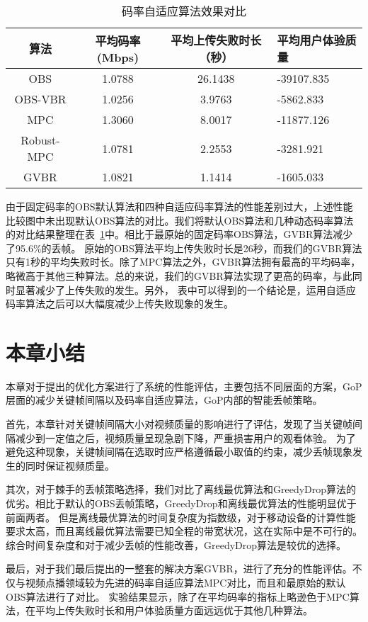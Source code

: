 \begin{table}[tb]
\centering
\caption{码率自适应算法效果对比}
\label{tab:vbr}
{\setlength{\tabcolsep}{2pt}
\begin{tabular}{|c|c|c|l|}
\hline
\textbf{算法} &\textbf{平均码率(Mbps)} &\textbf{平均上传失败时长（秒）} & \textbf{平均用户体验质量}    \\ \hline
OBS    &1.0788  &26.1438  &-39107.835           \\ \hline
OBS-VBR  &1.0256 &3.9763  &-5862.833         \\ \hline
MPC     &1.3060  &8.0017  &-11877.126 \\ \hline
Robust-MPC &1.0781 &2.2553 &-3281.921 \\ \hline
GVBR &1.0821 &1.1414 &-1605.033 \\ \hline
\end{tabular}}
\end{table}

由于固定码率的OBS默认算法和四种自适应码率算法的性能差别过大，上述性能比较图中未出现默认OBS算法的对比。我们将默认OBS算法和几种动态码率算法的对比结果整理在表~\ref{tab:vbr}中。相比于最原始的固定码率OBS算法，GVBR算法减少了95.6\%的丢帧。
原始的OBS算法平均上传失败时长是26秒，而我们的GVBR算法只有1秒的平均失败时长。除了MPC算法之外，GVBR算法拥有最高的平均码率，略微高于其他三种算法。总的来说，我们的GVBR算法实现了更高的码率，与此同时显著减少了上传失败的发生。另外，
表中可以得到的一个结论是，运用自适应码率算法之后可以大幅度减少上传失败现象的发生。

\section{本章小结}
本章对于提出的优化方案进行了系统的性能评估，主要包括不同层面的方案，GoP层面的减少关键帧间隔以及码率自适应算法，GoP内部的智能丢帧策略。

首先，本章针对关键帧间隔大小对视频质量的影响进行了评估，发现了当关键帧间隔减少到一定值之后，视频质量呈现急剧下降，严重损害用户的观看体验。
为了避免这种现象，关键帧间隔在选取时应严格遵循最小取值的约束，减少丢帧现象发生的同时保证视频质量。

其次，对于棘手的丢帧策略选择，我们对比了离线最优算法和GreedyDrop算法的优劣。相比于默认的OBS丢帧策略，GreedyDrop和离线最优算法的性能明显优于前面两者。
但是离线最优算法的时间复杂度为指数级，对于移动设备的计算性能要求太高，而且离线最优算法需要已知全程的带宽状况，这在实际中是不可行的。综合时间复杂度和对于减少丢帧的性能改善，GreedyDrop算法是较优的选择。

最后，对于我们最后提出的一整套的解决方案GVBR，进行了充分的性能评估。不仅与视频点播领域较为先进的码率自适应算法MPC对比，而且和最原始的默认OBS算法进行了对比。
实验结果显示，除了在平均码率的指标上略逊色于MPC算法，在平均上传失败时长和用户体验质量方面远远优于其他几种算法。
